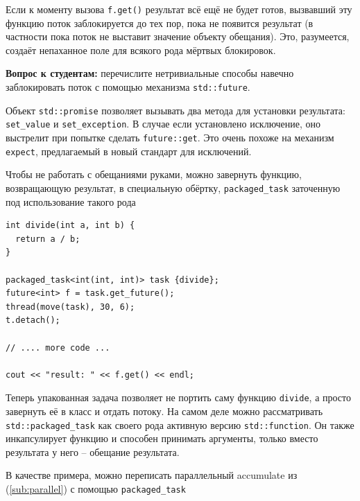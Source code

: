 \documentclass[a4paper,12pt,oneside]{book}
\newif\ifanswers
\begin{document}
Если к моменту вызова \lstinline!f.get()! результат всё ещё не будет готов, вызвавший эту функцию поток заблокируется до тех пор, пока не появится результат (в частности пока поток не выставит значение объекту обещания). Это, разумеется, создаёт непаханное поле для всякого рода мёртвых блокировок. 

\textbf{Вопрос к студентам:} перечислите нетривиальные способы навечно заблокировать поток с помощью механизма \lstinline!std::future!.

\ifanswers
Ответы довольно очевидны и все сводятся к тому, чтобы поставить выполнение обещания в обратную зависимость от его же результата
\fi

Объект \lstinline!std::promise! позволяет вызывать два метода для установки результата: \lstinline!set_value! и \lstinline!set_exception!. В случае если установлено исключение, оно выстрелит при попытке сделать \lstinline!future::get!. Это очень похоже на механизм \lstinline!expect!, предлагаемый в новый стандарт для исключений.

Чтобы не работать с обещаниями руками, можно завернуть функцию, возвращающую результат, в специальную обёртку, \lstinline!packaged_task! заточенную под использование такого рода

\begin{lstlisting}
int divide(int a, int b) {
  return a / b;
}

packaged_task<int(int, int)> task {divide};
future<int> f = task.get_future();
thread(move(task), 30, 6);
t.detach();

// .... more code ...

cout << "result: " << f.get() << endl;
\end{lstlisting}

Теперь упакованная задача позволяет не портить саму функцию \lstinline!divide!, а просто завернуть её в класс и отдать потоку. На самом деле можно рассматривать \lstinline!std::packaged_task! как своего рода активную версию \lstinline!std::function!. Он также инкапсулирует функцию и способен принимать аргументы, только вместо результата у него -- обещание результата.

В качестве примера, можно переписать параллельный accumulate из (\ref{sub:parallel}) с помощью \lstinline!packaged_task!
\end{document}
